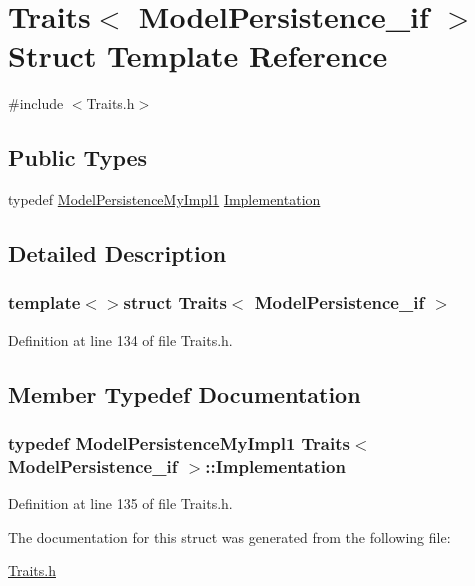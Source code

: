 \hypertarget{struct_traits_3_01_model_persistence__if_01_4}{\section{Traits$<$ Model\-Persistence\-\_\-if $>$ Struct Template Reference}
\label{struct_traits_3_01_model_persistence__if_01_4}
}


{\ttfamily \#include $<$Traits.\-h$>$}

\subsection*{Public Types}
\begin{DoxyCompactItemize}
\item 
typedef \hyperlink{class_model_persistence_my_impl1}{Model\-Persistence\-My\-Impl1} \hyperlink{struct_traits_3_01_model_persistence__if_01_4_aab21a3f51580006b6926b0ee0e4d6302}{Implementation}
\end{DoxyCompactItemize}


\subsection{Detailed Description}
\subsubsection*{template$<$$>$struct Traits$<$ Model\-Persistence\-\_\-if $>$}



Definition at line 134 of file Traits.\-h.



\subsection{Member Typedef Documentation}
\hypertarget{struct_traits_3_01_model_persistence__if_01_4_aab21a3f51580006b6926b0ee0e4d6302}{
\subsubsection[{Implementation}]{\setlength{\rightskip}{0pt plus 5cm}typedef {\bf Model\-Persistence\-My\-Impl1} {\bf Traits}$<$ {\bf Model\-Persistence\-\_\-if} $>$\-::{\bf Implementation}}}\label{struct_traits_3_01_model_persistence__if_01_4_aab21a3f51580006b6926b0ee0e4d6302}


Definition at line 135 of file Traits.\-h.



The documentation for this struct was generated from the following file\-:\begin{DoxyCompactItemize}
\item 
\hyperlink{_traits_8h}{Traits.\-h}\end{DoxyCompactItemize}
